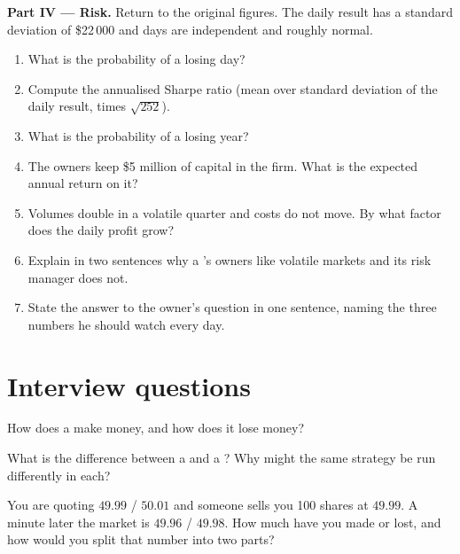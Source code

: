 \begin{problem}
\medskip\noindent\textbf{Part IV --- Risk.} Return to the original figures.
The daily result has a standard deviation of \$22\,000 and days are
independent and roughly normal.
\begin{enumerate}[resume]
\item What is the probability of a losing day?
\item Compute the annualised Sharpe ratio (mean over standard deviation of
the daily result, times $\sqrt{252}$).
\item What is the probability of a losing year?
\item The owners keep \$5 million of capital in the firm. What is the
expected annual return on it?
\item Volumes double in a volatile quarter and costs do not move. By what
factor does the daily profit grow?
\item Explain in two sentences why a 's owners like volatile
markets and its risk manager does not.
\item State the answer to the owner's question in one sentence, naming the
three numbers he should watch every day.
\end{enumerate}
\end{problem}

\section{Interview questions}

\begin{interviewq}\label{iq:m1:what-a-trading-firm-does:1}
How does a  make money, and how does it lose money?
\end{interviewq}

\begin{interviewq}\label{iq:m1:what-a-trading-firm-does:2}
What is the difference between a  and a ?
Why might the same strategy be run differently in each?
\end{interviewq}

\begin{interviewq}\label{iq:m1:what-a-trading-firm-does:3}
You are quoting $49.99$ / $50.01$ and someone sells you 100 shares at
$49.99$. A minute later the market is $49.96$ / $49.98$. How much have you
made or lost, and how would you split that number into two parts?
\end{interviewq}

